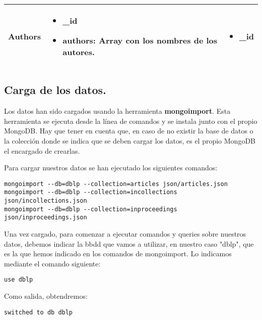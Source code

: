 \begin{center}
\begin{tabular}{ | l | l | l |}
    Authors &
    \begin{minipage}[t]{0.4\textwidth}
      \begin{itemize}
	\item \_id
	\item authors: Array con los nombres de los autores.
      \end{itemize}
    \end{minipage} & 
    \begin{minipage}[t]{0.3\textwidth}
      \begin{itemize}
	\item \_id
      \end{itemize} 
    \end{minipage}  \\ \hline
  \end{tabular}
\end{center}

\subsection{Carga de los datos.}

Los datos han sido cargados usando la herramienta \textbf{mongoimport}. Esta herramienta se ejecuta desde la línea de comandos y se instala junto con el propio MongoDB. Hay que tener en cuenta que, en caso de no existir la base de datos o la colección donde se indica que se deben cargar los datos, es el propio MongoDB el encargado de crearlas.

Para cargar nuestros datos se han ejecutado los siguientes comandos:

\begin{verbatim}
mongoimport --db=dblp --collection=articles json/articles.json
mongoimport --db=dblp --collection=incollections json/incollections.json
mongoimport --db=dblp --collection=inproceedings json/inproceedings.json
\end{verbatim}

Una vez cargado, para comenzar a ejecutar comandos y queries sobre nuestros datos, debemos indicar la bbdd que vamos a utilizar, en nuestro caso "dblp", que es la que hemos indicado en los comandos de mongoimport. Lo indicamos mediante el comando siguiente:

\begin{verbatim}
use dblp
\end{verbatim}

Como salida, obtendremos:

\begin{verbatim}
switched to db dblp
\end{verbatim}

